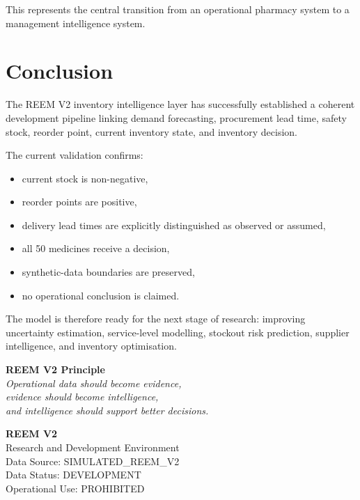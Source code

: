 \documentclass[11pt,a4paper]{article}
\begin{document}
This represents the central transition from an operational pharmacy
system to a management intelligence system.

\section{Conclusion}

The REEM V2 inventory intelligence layer has successfully established
a coherent development pipeline linking demand forecasting,
procurement lead time, safety stock, reorder point, current inventory
state, and inventory decision.

The current validation confirms:

\begin{itemize}
    \item current stock is non-negative,
    \item reorder points are positive,
    \item delivery lead times are explicitly distinguished as observed
          or assumed,
    \item all 50 medicines receive a decision,
    \item synthetic-data boundaries are preserved,
    \item no operational conclusion is claimed.
\end{itemize}

The model is therefore ready for the next stage of research:
improving uncertainty estimation, service-level modelling, stockout
risk prediction, supplier intelligence, and inventory optimisation.

\begin{tcolorbox}[
    colframe=titleColor,
    colback=white,
    arc=3mm
]
\centering
\large
\textbf{REEM V2 Principle}\\[0.2cm]
\textit{
Operational data should become evidence,\\
evidence should become intelligence,\\
and intelligence should support better decisions.
}
\end{tcolorbox}

\vfill

\begin{center}
\small
\textbf{REEM V2}\\
Research and Development Environment\\
Data Source: SIMULATED\_REEM\_V2\\
Data Status: DEVELOPMENT\\
Operational Use: PROHIBITED
\end{center}
\end{document}
